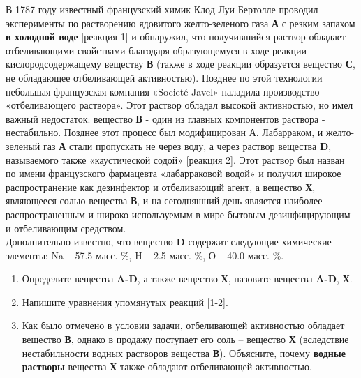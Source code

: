 В 1787 году известный французский химик Клод Луи Бертолле проводил эксперименты по растворению ядовитого желто-зеленого газа \textbf{А} с резким запахом \textbf{в холодной воде} [реакция 1] и обнаружил, что получившийся раствор обладает отбеливающими свойствами благодаря образующемуся в ходе реакции кислородсодержащему веществу \textbf{В} (также в ходе реакции образуется вещество \textbf{С}, не обладающее отбеливающей активностью). Позднее по этой технологии небольшая французская компания «Societé Javel» наладила производство «отбеливающего раствора». Этот раствор обладал высокой активностью, но имел важный недостаток: вещество \textbf{В} - один из главных компонентов раствора - нестабильно. Позднее этот процесс был модифицирован А. Лабарраком, и желто-зеленый газ \textbf{А} стали пропускать не через воду, а через раствор вещества \textbf{D}, называемого также «каустической содой» [реакция 2]. Этот раствор был назван по имени французского фармацевта «лабарраковой водой» и получил широкое распространение как дезинфектор и отбеливающий агент, а вещество \textbf{Х}, являющееся солью вещества \textbf{В}, и на сегодняшний день является наиболее распространенным и широко используемым в мире бытовым дезинфицирующим и отбеливающим средством.\\
Дополнительно известно, что вещество \textbf{D} содержит следующие химические элементы: Na – 57.5 масс. \%, H – 2.5 масс. \%, О – 40.0 масс. \%.
\begin{enumerate}
\item Определите вещества \textbf{A-D}, а также вещество \textbf{Х}, назовите вещества \textbf{A-D}, \textbf{Х}.
\item Напишите уравнения упомянутых реакций [1-2].
\item Как было отмечено в условии задачи, отбеливающей активностью обладает вещество \textbf{В}, однако в продажу поступает его соль – вещество \textbf{Х} (вследствие нестабильности водных растворов вещества \textbf{В}). Объясните, почему \textbf{водные растворы} вещества \textbf{Х} также обладают отбеливающей активностью.
\end{enumerate}